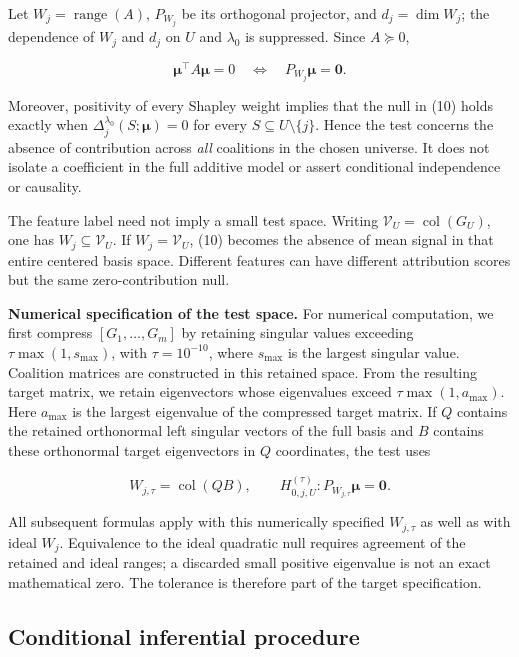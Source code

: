 \documentclass[
  11pt,
]{article}
\begin{document}
Let \(W_j=\operatorname{range}(A)\), \(P_{W_j}\) be its orthogonal
projector, and \(d_j=\dim W_j\); the dependence of \(W_j\) and \(d_j\)
on \(U\) and \(\lambda_0\) is suppressed. Since \(A\succeq0\),

\[
\boldsymbol\mu^\top A\boldsymbol\mu=0\quad\Longleftrightarrow\quad P_{W_j}\boldsymbol\mu=\boldsymbol0.
\tag{11}
\]

Moreover, positivity of every Shapley weight implies that the null in
(10) holds exactly when \(\Delta_j^{\lambda_0}(S;\boldsymbol\mu)=0\) for
every \(S\subseteq U\setminus\{j\}\). Hence the test concerns the
absence of contribution across \emph{all} coalitions in the chosen
universe. It does not isolate a coefficient in the full additive model
or assert conditional independence or causality.

The feature label need not imply a small test space. Writing
\(\mathcal V_U=\operatorname{col}(G_U)\), one has
\(W_j\subseteq\mathcal V_U\). If \(W_j=\mathcal V_U\), (10) becomes the
absence of mean signal in that entire centered basis space. Different
features can have different attribution scores but the same
zero-contribution null.

\textbf{Numerical specification of the test space.} For numerical
computation, we first compress \([G_1,\ldots,G_m]\) by retaining
singular values exceeding \(\tau\max(1,s_{\max})\), with
\(\tau=10^{-10}\), where \(s_{\max}\) is the largest singular value.
Coalition matrices are constructed in this retained space. From the
resulting target matrix, we retain eigenvectors whose eigenvalues exceed
\(\tau\max(1,a_{\max})\). Here \(a_{\max}\) is the largest eigenvalue of
the compressed target matrix. If \(Q\) contains the retained orthonormal
left singular vectors of the full basis and \(B\) contains these
orthonormal target eigenvectors in \(Q\) coordinates, the test uses

\[
W_{j,\tau}=\operatorname{col}(QB),\qquad
H_{0,j,U}^{(\tau)}:P_{W_{j,\tau}}\boldsymbol\mu=\boldsymbol0.
\tag{12}
\]

All subsequent formulas apply with this numerically specified
\(W_{j,\tau}\) as well as with ideal \(W_j\). Equivalence to the ideal
quadratic null requires agreement of the retained and ideal ranges; a
discarded small positive eigenvalue is not an exact mathematical zero.
The tolerance is therefore part of the target specification.

\subsection{Conditional inferential
procedure}\label{conditional-inferential-procedure}
\end{document}

